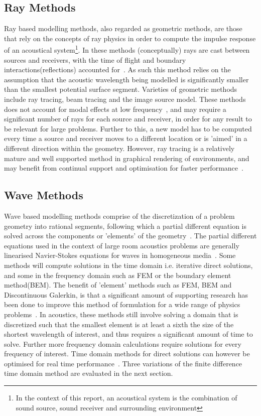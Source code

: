 \documentclass{svproc}
\begin{document}
\subsection{Ray Methods}

Ray based modelling methods, also regarded as geometric methods, are those that rely on the concepts of ray physics in order to compute the impulse response of an acoustical system\footnote{In the context of this report, an acoustical system is the combination of sound source, sound receiver and surrounding environment}. In these methods (conceptually) rays are cast between sources and receivers, with the time of flight and boundary interactions(reflections) accounted for~\cite{Elorza2005}. As such this method relies on the assumption that the acoustic wavelength being modelled is significantly smaller than the smallest potential surface segment. Varieties of geometric methods include ray tracing, beam tracing and the image source model. These methods does not account for modal effects at low frequency~\cite{Rober2007}, and may require a significant number of rays for each source and receiver, in order for any result to be relevant for large problems. Further to this, a new model has to be computed every time a source and receiver moves to a different location or is 'aimed' in a different direction within the geometry. However, ray tracing is a relatively mature and well supported method in graphical rendering of environments, and may benefit from continual support and optimisation for faster performance~\cite{Rober2007}.


\subsection{Wave Methods}

Wave based modelling methods comprise of the discretization of a problem geometry into rational segments, following which a partial different equation is solved across the components or 'elements' of the geometry~\cite{Bilbao2004}. The partial different equations used in the context of large room acoustics problems are generally linearised Navier-Stokes equations for waves in homogeneous media~\cite{Rienstra1952a}. Some methods will compute solutions in the time domain i.e. iterative direct solutions, and some in the frequency domain such as FEM or the boundary element method(BEM). The benefit of 'element' methods such as FEM, BEM and Discontinuous Galerkin, is that a significant amount of supporting research has been done to improve this method of formulation for a wide range of physics problems~\cite{Zienkiewicz2013}. In acoustics, these methods still involve solving a domain that is discretized such that the smallest element is at least a sixth the size of the shortest wavelength of interest, and thus requires a significant amount of time to solve. Further more frequency domain calculations require solutions for every frequency of interest. Time domain methods for direct solutions can however be optimised for real time performance~\cite{Savioja2010}. Three variations of the finite difference time domain method are evaluated in the next section.
\end{document}
